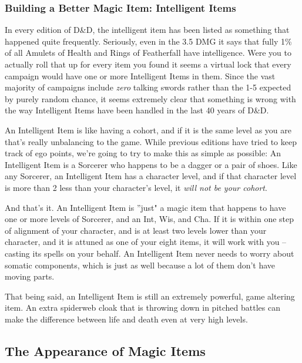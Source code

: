\subsubsection{Building a Better Magic Item: Intelligent Items}
\vspace*{-8pt}

In every edition of D\&D, the intelligent item has been listed as something that happened quite frequently. Seriously, even in the 3.5 DMG it says that fully 1\% of all Amulets of Health and Rings of Featherfall have intelligence. Were you to actually roll that up for every item you found it seems a virtual lock that every campaign would have one or more Intelligent Items in them. Since the vast majority of campaigns include \textit{zero} talking swords rather than the 1-5 expected by purely random chance, it seems extremely clear that something is wrong with the way Intelligent Items have been handled in the last 40 years of D\&D.

An Intelligent Item is like having a cohort, and if it is the same level as you are that's really unbalancing to the game. While previous editions have tried to keep track of ego points, we're going to try to make this as simple as possible: An Intelligent Item is a Sorcerer who happens to be a dagger or a pair of shoes. Like any Sorcerer, an Intelligent Item has a character level, and if that character level is more than 2 less than your character's level, it \textit{will not be your cohort}.

And that's it. An Intelligent Item is ''just" a magic item that happens to have one or more levels of Sorcerer, and an Int, Wis, and Cha. If it is within one step of alignment of your character, and is at least two levels lower than your character, and it is attuned as one of your eight items, it will work with you -- casting its spells on your behalf. An Intelligent Item never needs to worry about somatic components, which is just as well because a lot of them don't have moving parts.

That being said, an Intelligent Item is still an extremely powerful, game altering item. An extra spiderweb cloak that is throwing down  in pitched battles can make the difference between life and death even at very high levels.

\subsection{The Appearance of Magic Items}
\vspace*{-8pt}


